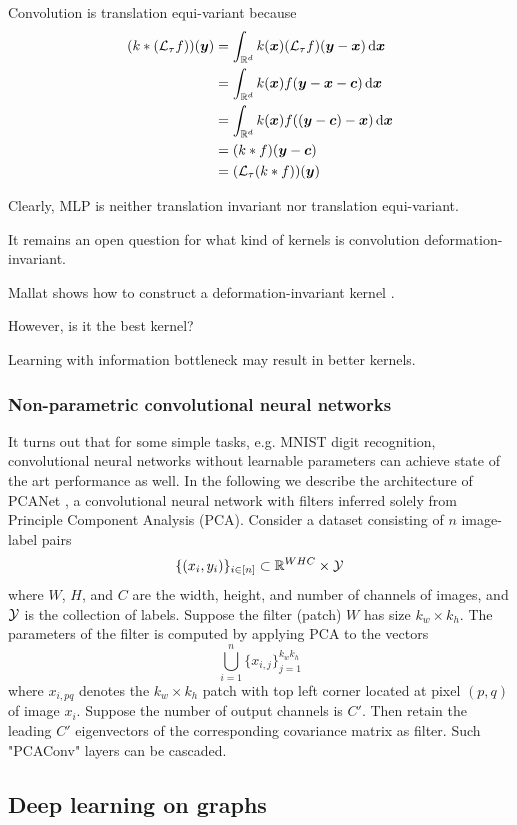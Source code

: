 \documentclass{article}
\begin{document}
Convolution is translation equi-variant because
\begin{align*}
(k * (\call_\tau f)) (\bmy)
& = \int_{\bbr^d} k(\bmx) (\call_\tau f) (\bmy - \bmx) \dif \bmx \\
& = \int_{\bbr^d} k(\bmx) f(\bmy - \bmx - \bmc) \dif \bmx \\
& = \int_{\bbr^d} k(\bmx) f((\bmy - \bmc) - \bmx) \dif \bmx \\
& = (k * f) (\bmy - \bmc) \\
& = (\call_\tau (k * f)) (\bmy)
\end{align*}

Clearly, MLP is neither translation invariant nor translation equi-variant.

It remains an open question for what kind of kernels is convolution deformation-invariant.

Mallat shows how to construct a deformation-invariant kernel \cite{mallat2012group}.

However, is it the best kernel?

Learning with information bottleneck may result in better kernels.

\subsubsection{Non-parametric convolutional neural networks}

It turns out that for some simple tasks, e.g. MNIST digit recognition, convolutional neural networks without learnable parameters can achieve state of the art performance as well.
In the following we describe the architecture of PCANet \cite{chan2015pcanet}, a convolutional neural network with filters inferred solely from Principle Component Analysis (PCA).
Consider a dataset consisting of $n$ image-label pairs
\[
\{(x_i, y_i)\}_{i \in [n]} \subset {\mathbb R}^{W H C} \times {\mathcal Y}
\]
where $W$, $H$, and $C$ are the width, height, and number of channels of images, and ${\mathcal Y}$ is the collection of labels.
Suppose the filter (patch) $W$ has size $k_w \times k_h$.
The parameters of the filter is computed by applying PCA to the vectors
\[
\bigcup_{i = 1}^n \{x_{i, j}\}_{j = 1}^{k_w k_h}
\]
where $x_{i, pq}$ denotes the $k_w \times k_h$ patch with top left corner located at pixel $(p, q)$ of image $x_i$.
Suppose the number of output channels is $C'$.
Then retain the leading $C'$ eigenvectors of the corresponding covariance matrix as filter.
Such "PCAConv" layers can be cascaded.

\subsection{Deep learning on graphs}
\end{document}
